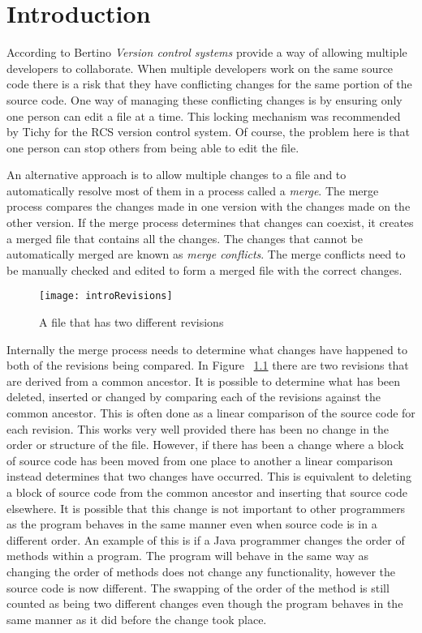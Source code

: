 
\chapter{Introduction}\label{C:intro}

According to Bertino \cite{Bertino2012} \emph{Version control systems} provide a way of allowing multiple developers to collaborate. When multiple developers work on the same source code there is a risk that they have conflicting changes for the same portion of the source code.  One way of managing these conflicting changes is by ensuring only one person can edit a file at a time. This locking mechanism was recommended by Tichy \cite{Tichy1982} for the RCS version control system. Of course, the problem here is that one person can stop others from being able to edit the file. 

An alternative approach is to allow multiple changes to a file and to automatically resolve most of them in a process called a \emph{merge}.  The merge process compares the changes made in one version with the changes made on the other version. If the merge process determines that changes can coexist, it creates a merged file that contains all the changes. The changes that cannot be automatically merged are known as \emph{merge conflicts}.  The merge conflicts need to be manually checked and edited to form a merged file with the correct changes.

\begin{figure}[!t]
 \begin{center}
 \texttt{[image: introRevisions]}
 \end{center}
 \caption{A file that has two different revisions}
 \label{fig:introRevisions}
\end{figure}



Internally the merge process needs to determine what changes have happened to both of the revisions being compared. In Figure  ~\ref{fig:introRevisions} there are two revisions that are derived from a common ancestor. It is possible to determine what has been deleted, inserted or changed by comparing each of the revisions against the common ancestor.  This is often done as a linear comparison of the source code for each revision. This works very well provided there has been no change in the order or structure of the file. However, if there has been a change where a block of source code has been moved from one place to another a linear comparison instead determines that two changes have occurred.  This is equivalent to deleting a block of source code from the common ancestor and inserting that source code elsewhere. It is possible that this change is not important to other programmers as the program behaves in the same manner even when source code is in a different order.  An example of this is if a Java programmer changes the order of methods within a program.  The program will behave in the same way as changing the order of methods does not change any functionality, however the source code is now different. The swapping of the order of the method is still counted as being two different changes even though the program behaves in the same manner as it did before the change took place.

